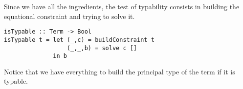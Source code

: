 \documentclass{jfp1}
\begin{document}
Since we have all the ingredients, the test of typability consists in building the equational constraint and trying to
solve it. 
\begin{verbatim}
isTypable :: Term -> Bool
isTypable t = let (_,c) = buildConstraint t 
                  (_,_,b) = solve c []
              in b
\end{verbatim}
Notice that we have everything to build the principal type of the term if it is
typable. 
\end{document}
